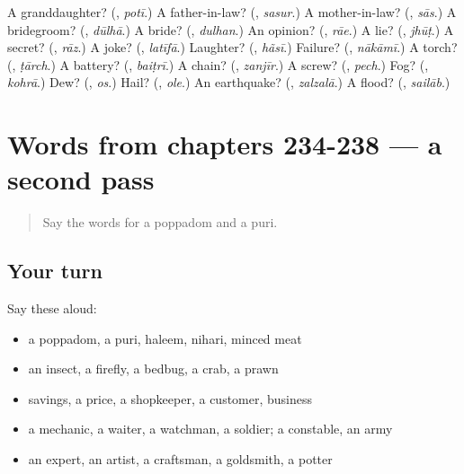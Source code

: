 \begin{tcolorbox}[breakable,colback=teal!4,colframe=teal!35!black,title={Before you move on}]
A granddaughter? (\textbf{}, \emph{potī}.) A father-in-law? (\textbf{}, \emph{sasur}.) A mother-in-law? (\textbf{}, \emph{sās}.) A bridegroom? (\textbf{}, \emph{dūlhā}.) A bride? (\textbf{}, \emph{dulhan}.) An opinion? (\textbf{}, \emph{rāe}.) A lie? (\textbf{}, \emph{jhūṭ}.) A secret? (\textbf{}, \emph{rāz}.) A joke? (\textbf{}, \emph{latīfā}.) Laughter? (\textbf{}, \emph{hãsī}.) Failure? (\textbf{}, \emph{nākāmī}.) A torch? (\textbf{}, \emph{ṭārch}.) A battery? (\textbf{}, \emph{baiṭrī}.) A chain? (\textbf{}, \emph{zanjīr}.) A screw? (\textbf{}, \emph{pech}.) Fog? (\textbf{}, \emph{kohrā}.) Dew? (\textbf{}, \emph{os}.) Hail? (\textbf{}, \emph{ole}.) An earthquake? (\textbf{}, \emph{zalzalā}.) A flood? (\textbf{}, \emph{sailāb}.)
\end{tcolorbox}
\section[(dialogue)]{Words from chapters 234-238 — a second pass}

\label{lesson:UR-R238-second-pass-words-from-chapters-234-238}



\begin{quote}
Say the words for a poppadom and a puri.
\end{quote}

\subsection*{Your turn}
Say these aloud:

\begin{itemize}
\raggedright
  \item a poppadom, a puri, haleem, nihari, minced meat
  \item an insect, a firefly, a bedbug, a crab, a prawn
  \item savings, a price, a shopkeeper, a customer, business
  \item a mechanic, a waiter, a watchman, a soldier; a constable, an army
  \item an expert, an artist, a craftsman, a goldsmith, a potter
\end{itemize}

